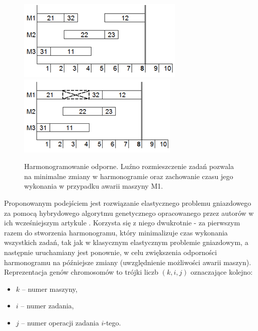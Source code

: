 \documentclass[printmode,oneside]{mgr}
\begin{document}
\begin{figure}[!ht]
\begin{center}
\includegraphics[width=1.0\linewidth]{rysunki/odporny_jobshopA.png}
\endminipage \hfill
{}%
\includegraphics[width=1.0\linewidth]{rysunki/odporny_jobshopB.png}
\endminipage
\caption[Harmonogramowanie odporne]{Harmonogramowanie odporne. Luźno rozmieszczenie zadań pozwala na minimalne zmiany w harmonogramie oraz zachowanie czasu jego wykonania w przypadku awarii maszyny M1.}
\label{rys_odporny_jobshop}
\end{center}
\end{figure}
Proponowanym podejściem jest rozwiązanie elastycznego problemu gniazdowego za pomocą hybrydowego algorytmu genetycznego opracowanego przez autorów \cite{RFJSRMB_ElMekkawy11} w ich wcześniejszym artykule \cite{AEHGAFJS_ElMekkawy11}. Korzysta się z niego dwukrotnie - za pierwszym razem do stworzenia harmonogramu, który minimalizuje czas wykonania wszystkich zadań, tak jak w klasycznym elastycznym problemie gniazdowym, a następnie uruchamiany jest ponownie, w celu zwiększenia odporności harmonogramu na późniejsze zmiany (uwzględnienie możliwości awarii maszyn). Reprezentacja genów chromosomów to trójki liczb $(k,i,j)$ oznaczające kolejno:
\begin{itemize}
    \item $k$ -- numer maszyny,
    \item $i$ -- numer zadania,
    \item $j$ -- numer operacji zadania $i$-tego.
\end{itemize}
\end{document}

